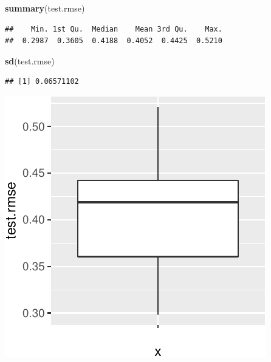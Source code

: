 \documentclass[]{article}
\newenvironment{Shaded}{\begin{snugshade}}{\end{snugshade}}
\newcommand{\KeywordTok}[1]{\textcolor[rgb]{0.13,0.29,0.53}{\textbf{#1}}}
\newcommand{\DataTypeTok}[1]{\textcolor[rgb]{0.13,0.29,0.53}{#1}}
\newcommand{\StringTok}[1]{\textcolor[rgb]{0.31,0.60,0.02}{#1}}
\newcommand{\OperatorTok}[1]{\textcolor[rgb]{0.81,0.36,0.00}{\textbf{#1}}}
\newcommand{\NormalTok}[1]{#1}
\begin{document}
\begin{Shaded}
\begin{Highlighting}[]
\KeywordTok{summary}\NormalTok{(test.rmse)}
\end{Highlighting}
\end{Shaded}

\begin{verbatim}
##    Min. 1st Qu.  Median    Mean 3rd Qu.    Max. 
##  0.2987  0.3605  0.4188  0.4052  0.4425  0.5210
\end{verbatim}

\begin{Shaded}
\begin{Highlighting}[]
\KeywordTok{sd}\NormalTok{(test.rmse)}
\end{Highlighting}
\end{Shaded}

\begin{verbatim}
## [1] 0.06571102
\end{verbatim}

\begin{Shaded}
\end{Shaded}

\begin{center}\includegraphics{kfold_supplement_files/figure-latex/unnamed-chunk-10-1} \end{center}
\end{document}
